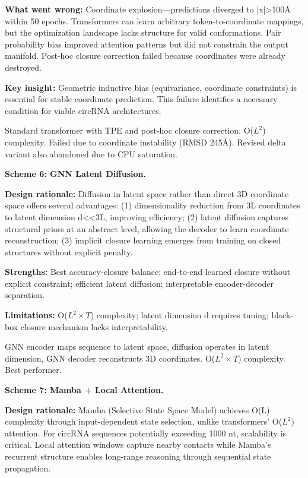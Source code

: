 \documentclass[12pt]{article}
\begin{document}
\textbf{What went wrong:} Coordinate explosion---predictions diverged to |x|>100Å within 50 epochs. Transformers can learn arbitrary token-to-coordinate mappings, but the optimization landscape lacks structure for valid conformations. Pair probability bias improved attention patterns but did not constrain the output manifold. Post-hoc closure correction failed because coordinates were already destroyed.

\textbf{Key insight:} Geometric inductive bias (equivariance, coordinate constraints) is essential for stable coordinate prediction. This failure identifies a necessary condition for viable circRNA architectures.

Standard transformer with TPE and post-hoc closure correction. O($L^2$) complexity. Failed due to coordinate instability (RMSD 245\AA). Revised delta variant also abandoned due to CPU saturation.

\textbf{Scheme 6: GNN Latent Diffusion.}

\textbf{Design rationale:} Diffusion in latent space rather than direct 3D coordinate space offers several advantages: (1) dimensionality reduction from 3L coordinates to latent dimension d<<3L, improving efficiency; (2) latent diffusion captures structural priors at an abstract level, allowing the decoder to learn coordinate reconstruction; (3) implicit closure learning emerges from training on closed structures without explicit penalty.

\textbf{Strengths:} Best accuracy-closure balance; end-to-end learned closure without explicit constraint; efficient latent diffusion; interpretable encoder-decoder separation.

\textbf{Limitations:} O($L^2 \times T$) complexity; latent dimension d requires tuning; black-box closure mechanism lacks interpretability.

GNN encoder maps sequence to latent space, diffusion operates in latent dimension, GNN decoder reconstructs 3D coordinates. O($L^2 \times T$) complexity. Best performer.

\textbf{Scheme 7: Mamba + Local Attention.}

\textbf{Design rationale:} Mamba (Selective State Space Model) \citep{gu2023} achieves O(L) complexity through input-dependent state selection, unlike transformers' O($L^2$) attention. For circRNA sequences potentially exceeding 1000 nt, scalability is critical. Local attention windows capture nearby contacts while Mamba's recurrent structure enables long-range reasoning through sequential state propagation.
\end{document}
